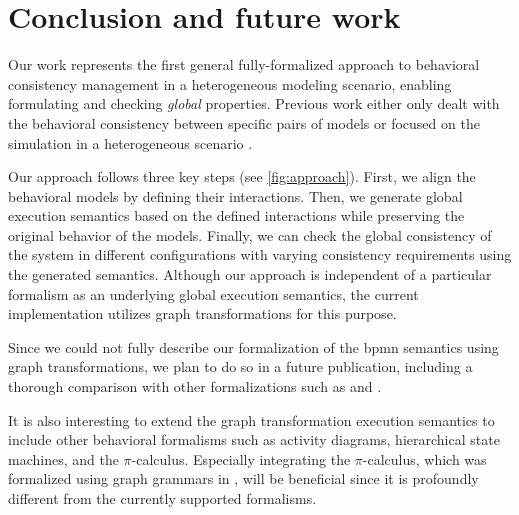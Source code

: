 \documentclass{jot}
\begin{document}
\section{Conclusion and future work} \label{sec:conclusion_and_future_work}
Our work represents the first general fully-formalized approach to behavioral consistency management in a heterogeneous modeling scenario, enabling formulating and checking \emph{global} properties.
Previous work either only dealt with the behavioral consistency between specific pairs of models \cite{yaoConsistencyCheckingUML2006, kusterExplicitBehavioralConsistency2003} or focused on the simulation in a heterogeneous scenario \cite{deantoniModelingBehavioralSemantics2016, varalarsenBCoolBehavioralCoordination2016, ekerTamingHeterogeneityPtolemy2003, leeDisciplinedHeterogeneousModeling2010}.

Our approach follows three key steps (see \autoref{fig:approach}).
First, we align the behavioral models by defining their interactions.
Then, we generate global execution semantics based on the defined interactions while preserving the original behavior of the models.
Finally, we can check the global consistency of the system in different configurations with varying consistency requirements using the generated semantics.
Although our approach is independent of a particular formalism as an underlying global execution semantics, the current implementation utilizes graph transformations for this purpose.

Since we could not fully describe our formalization of the \gls*{bpmn} semantics using graph transformations, we plan to do so in a future publication, including a thorough comparison with other formalizations such as \cite{vangorpVisualTokenbasedFormalization2013} and \cite{dijkmanSemanticsAnalysisBusiness2008}.

It is also interesting to extend the graph transformation execution semantics to include other behavioral formalisms such as activity diagrams, hierarchical state machines, and the $\pi$-calculus.
Especially integrating the $\pi$-calculus, which was formalized using graph grammars in \cite{gadducciGraphRewritingPcalculus2007}, will be beneficial since it is profoundly different from the currently supported formalisms.
\end{document}
